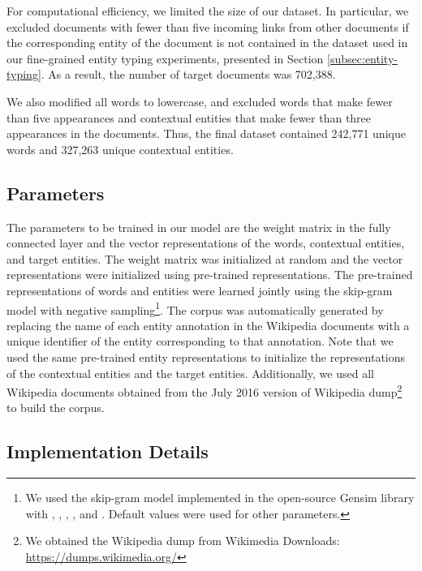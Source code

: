 \documentclass[11pt]{article}
\begin{document}
  For computational efficiency, we limited the size of our dataset.
  In particular, we excluded documents with fewer than five incoming links from other documents if the corresponding entity of the document is not contained in the dataset used in our fine-grained entity typing experiments, presented in Section \ref{subsec:entity-typing}.
  As a result, the number of target documents was 702,388.


  We also modified all words to lowercase, and excluded words that make fewer than five appearances and contextual entities that make fewer than three appearances in the documents.
  Thus, the final dataset contained 242,771 unique words and 327,263 unique contextual entities.


  \subsection{Parameters}
  \label{subsec:parameters}

  The parameters to be trained in our model are the weight matrix  in the fully connected layer and the vector representations of the words, contextual entities, and target entities.
  The weight matrix was initialized at random and the vector representations were initialized using pre-trained representations.
  The pre-trained representations of words and entities were learned jointly using the skip-gram model \cite{Mikolov2013,Mikolov2013a} with negative sampling\footnote{We used the skip-gram model implemented in the open-source Gensim library with , , , , and . Default values were used for other parameters.}.
  The corpus was automatically generated by replacing the name of each entity annotation in the Wikipedia documents with a unique identifier of the entity corresponding to that annotation.
  Note that we used the same pre-trained entity representations to initialize the representations of the contextual entities and the target entities.
  Additionally, we used all Wikipedia documents obtained from the July 2016 version of Wikipedia dump\footnote{We obtained the Wikipedia dump from Wikimedia Downloads: \url{https://dumps.wikimedia.org/}} to build the corpus.

  \subsection{Implementation Details}
\end{document}
